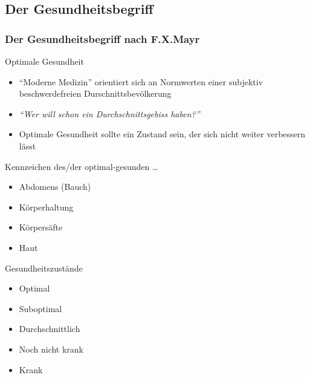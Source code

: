 \documentclass[xcolor=dvipsnames]{beamer}
\begin{document}
    \subsection{Der Gesundheitsbegriff}
    \begin{frame}[allowframebreaks]
        \frametitle{Der Gesundheitsbegriff nach F.X.Mayr}

        \begin{block}{Optimale Gesundheit}
            \begin{itemize}
                \setlength\itemsep{1em}
                \item "`Moderne Medizin"' orientiert sich an Normwerten einer subjektiv beschwerdefreien Durschnittsbevölkerung
                \item \textit{"`Wer will schon ein Durchschnittsgebiss haben?"'}
                \item Optimale Gesundheit sollte ein Zustand sein, der sich nicht weiter verbessern lässt
            \end{itemize}
        \end{block}

        \framebreak

        \begin{block}{Kennzeichen des/der optimal-gesunden \ldots}
            \begin{itemize}
                \setlength\itemsep{1em}
                \item Abdomens (Bauch)
                \item Körperhaltung
                \item Körpersäfte
                \item Haut
            \end{itemize}
        \end{block}

        \begin{block}{Gesundheitszustände}
            \begin{itemize}
                \item Optimal
                \item Suboptimal
                \item Durchschnittlich
                \item Noch nicht krank
                \item Krank
            \end{itemize}
        \end{block}
    \end{frame}
\end{document}
